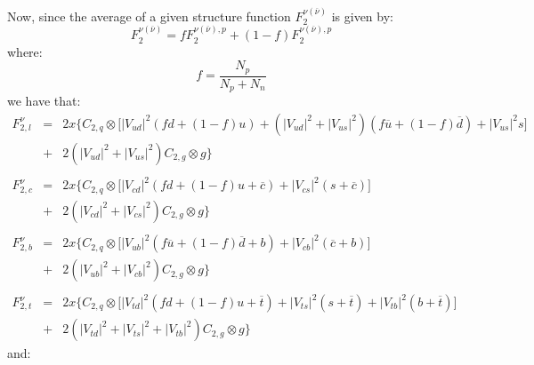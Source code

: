 \documentclass[10pt,a4paper]{article}
\begin{document}
Now, since the average of a given structure function
$F_2^{\nu(\overline{\nu})}$ is given by:
\begin{equation}
F_2^{\nu(\overline{\nu})} = fF_2^{\nu(\overline{\nu}),p}+(1-f)F_2^{\nu(\overline{\nu}),p}
\end{equation}
where:
\begin{equation}
f=\frac{N_p}{N_p+N_n}
\end{equation}
we have that:
\begin{equation}
\begin{array}{rcl}  
F_{2,l}^{\nu} &=& 2x\Big\{C_{2,q}\otimes\Big[|V_{ud}|^2 (fd+(1-f)u) +\left(|V_{ud}|^2+|V_{us}|^2\right)(f\overline{u}+(1-f)\overline{d}) + |V_{us}|^2 s\Big]\\
              &+& 2\left(|V_{ud}|^2+|V_{us}|^2\right)C_{2,g}\otimes g\Big\}\\
\\
F_{2,c}^{\nu} &=& 2x\Big\{C_{2,q}\otimes\Big[|V_{cd}|^2(fd+(1-f)u+\overline{c}) + |V_{cs}|^2 (s+\overline{c})\Big]\\
              &+& 2\left(|V_{cd}|^2+|V_{cs}|^2\right)C_{2,g}\otimes g\Big\}\\
\\
F_{2,b}^{\nu} &=& 2x\Big\{C_{2,q}\otimes\Big[|V_{ub}|^2 (f\overline{u}+(1-f)\overline{d}+b) + |V_{cb}|^2 (\overline{c}+b)\Big]\\
              &+& 2\left(|V_{ub}|^2+|V_{cb}|^2\right)C_{2,g}\otimes g\Big\}\\
\\
F_{2,t}^{\nu} &=& 2x\Big\{C_{2,q}\otimes\Big[|V_{td}|^2 (fd+(1-f)u +\overline{t})+ |V_{ts}|^2(s+\overline{t}) + |V_{tb}|^2(b+\overline{t})\Big]\\
              &+& 2\left(|V_{td}|^2 + |V_{ts}|^2 + |V_{tb}|^2\right)C_{2,g}\otimes g\Big\}
\end{array}
\end{equation}
and:
\end{document}
